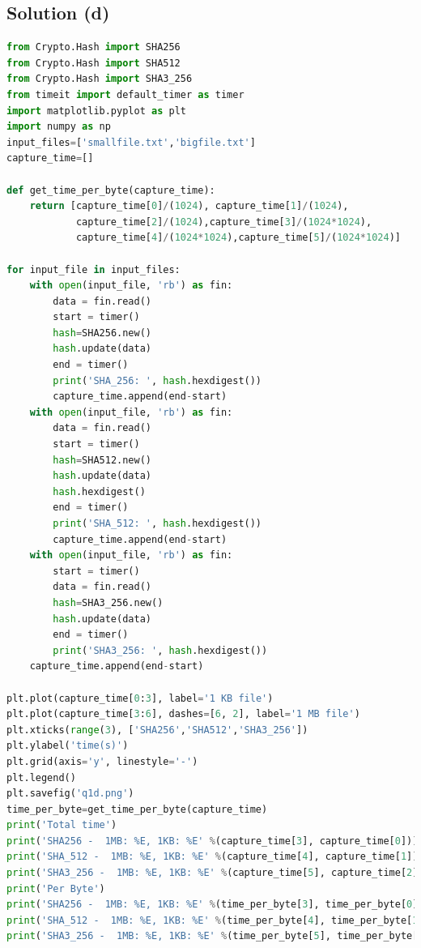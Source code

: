 \documentclass[12pt]{article}%
\begin{document}
\subsection{Solution (d)}
\begin{lstlisting}[language=Python]
from Crypto.Hash import SHA256
from Crypto.Hash import SHA512
from Crypto.Hash import SHA3_256
from timeit import default_timer as timer
import matplotlib.pyplot as plt
import numpy as np
input_files=['smallfile.txt','bigfile.txt']
capture_time=[]

def get_time_per_byte(capture_time):
    return [capture_time[0]/(1024), capture_time[1]/(1024),
            capture_time[2]/(1024),capture_time[3]/(1024*1024),
            capture_time[4]/(1024*1024),capture_time[5]/(1024*1024)]

for input_file in input_files:
    with open(input_file, 'rb') as fin:
        data = fin.read()
        start = timer()
        hash=SHA256.new()
        hash.update(data)
        end = timer()
        print('SHA_256: ', hash.hexdigest())
        capture_time.append(end-start)
    with open(input_file, 'rb') as fin:
        data = fin.read()
        start = timer()
        hash=SHA512.new()
        hash.update(data)
        hash.hexdigest()
        end = timer()
        print('SHA_512: ', hash.hexdigest())
        capture_time.append(end-start)
    with open(input_file, 'rb') as fin:
        start = timer()
        data = fin.read()
        hash=SHA3_256.new()
        hash.update(data)
        end = timer()
        print('SHA3_256: ', hash.hexdigest())
    capture_time.append(end-start)

plt.plot(capture_time[0:3], label='1 KB file')
plt.plot(capture_time[3:6], dashes=[6, 2], label='1 MB file')
plt.xticks(range(3), ['SHA256','SHA512','SHA3_256'])
plt.ylabel('time(s)')
plt.grid(axis='y', linestyle='-')
plt.legend()
plt.savefig('q1d.png')
time_per_byte=get_time_per_byte(capture_time)
print('Total time')
print('SHA256 -  1MB: %E, 1KB: %E' %(capture_time[3], capture_time[0]))
print('SHA_512 -  1MB: %E, 1KB: %E' %(capture_time[4], capture_time[1]))
print('SHA3_256 -  1MB: %E, 1KB: %E' %(capture_time[5], capture_time[2]))
print('Per Byte')
print('SHA256 -  1MB: %E, 1KB: %E' %(time_per_byte[3], time_per_byte[0]))
print('SHA_512 -  1MB: %E, 1KB: %E' %(time_per_byte[4], time_per_byte[1]))
print('SHA3_256 -  1MB: %E, 1KB: %E' %(time_per_byte[5], time_per_byte[2]))

\end{lstlisting}
\end{document}
